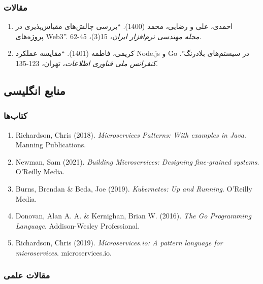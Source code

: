 \documentclass[
]{article}
\begin{document}
\subsubsection{مقالات}\label{ux645ux642ux627ux644ux627ux62a}

\begin{enumerate}
\def\labelenumi{\arabic{enumi}.}
\setcounter{enumi}{3}
\item
  احمدی، علی و رضایی، محمد (1400). ``بررسی چالش‌های مقیاس‌پذیری در
  پروژه‌های Web3''. \emph{مجله مهندسی نرم‌افزار ایران}، 15(3)، 45-62.
\item
  کریمی، فاطمه (1401). ``مقایسه عملکرد Node.js و Go در سیستم‌های
  بلادرنگ''. \emph{کنفرانس ملی فناوری اطلاعات}، تهران، 123-135.
\end{enumerate}

\subsection{منابع
انگلیسی}\label{ux645ux646ux627ux628ux639-ux627ux646ux6afux644ux6ccux633ux6cc}

\subsubsection{کتاب‌ها}\label{ux6a9ux62aux627ux628ux647ux627-1}

\begin{enumerate}
\def\labelenumi{\arabic{enumi}.}
\setcounter{enumi}{5}
\item
  Richardson, Chris (2018). \emph{Microservices Patterns: With examples
  in Java}. Manning Publications.
\item
  Newman, Sam (2021). \emph{Building Microservices: Designing
  fine-grained systems}. O'Reilly Media.
\item
  Burns, Brendan \& Beda, Joe (2019). \emph{Kubernetes: Up and Running}.
  O'Reilly Media.
\item
  Donovan, Alan A. A. \& Kernighan, Brian W. (2016). \emph{The Go
  Programming Language}. Addison-Wesley Professional.
\item
  Richardson, Chris (2019). \emph{Microservices.io: A pattern language
  for microservices}. microservices.io.
\end{enumerate}

\subsubsection{مقالات
علمی}\label{ux645ux642ux627ux644ux627ux62a-ux639ux644ux645ux6cc}
\end{document}
